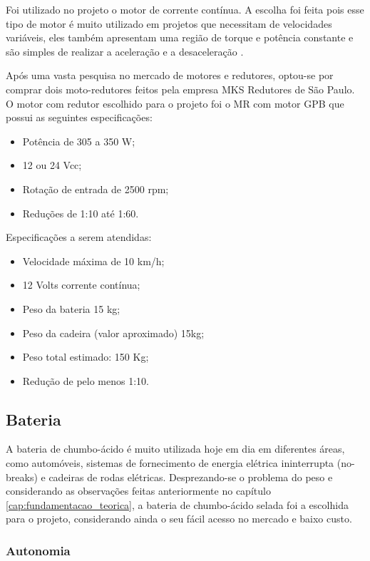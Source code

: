   Foi utilizado no projeto o motor de corrente contínua. A escolha foi feita pois esse tipo de motor é muito utilizado em projetos que necessitam de velocidades variáveis, eles também apresentam uma região de torque e potência constante e são simples de realizar a aceleração e a desaceleração \cite{manual_bateria_unipower}.

  Após uma vasta pesquisa no mercado de motores e redutores, optou-se por comprar dois moto-redutores feitos pela empresa MKS Redutores de São Paulo. O motor com redutor escolhido para o projeto foi o MR com motor GPB que possui as seguintes especificações:

  \begin{itemize}
    \item Potência de 305 a 350 W;
    \item 12 ou 24 Vcc;
    \item Rotação de entrada de 2500 rpm;
    \item Reduções de 1:10 até 1:60.
  \end{itemize}

  Especificações a serem atendidas:

  \begin{itemize}
    \item Velocidade máxima de 10 km/h;
    \item 12 Volts corrente contínua;
    \item Peso da bateria 15 kg;
    \item Peso da cadeira (valor aproximado) 15kg;
    \item Peso total estimado: 150 Kg;
    \item Redução de pelo menos 1:10.
  \end{itemize}

  \subsection{Bateria}

  A bateria de chumbo-ácido é muito utilizada hoje em dia em diferentes áreas, como automóveis, sistemas de fornecimento de energia elétrica ininterrupta (no-breaks) e cadeiras de rodas elétricas. Desprezando-se o problema do peso e considerando as observações feitas anteriormente no capítulo \ref{cap:fundamentacao_teorica}, a bateria de chumbo-ácido selada foi a escolhida para o projeto, considerando ainda o seu fácil acesso no mercado e baixo custo.

  \subsubsection{Autonomia}

